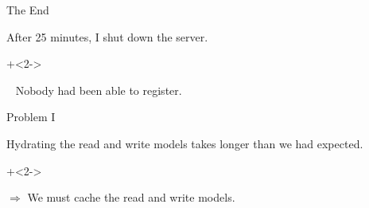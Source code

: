 \begin{frame}[fragile]{The End}

After 25 minutes, I shut down the server.
                  
\onslide+<2->
                  
\vspace{3em}

~ \hspace{10em} Nobody had been able to register.
                  
\end{frame}

\begin{frame}[fragile]{Problem I}

Hydrating the read and write models takes longer than we had expected.
                  
\onslide+<2->
                  
\vspace{3em}

$\Longrightarrow$ We must cache the read and write models.
                  
\end{frame}


